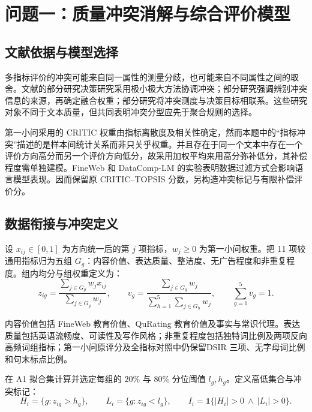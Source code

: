 
\section{问题一：质量冲突消解与综合评价模型}
\label{sec:q12}

\subsection{文献依据与模型选择}

多指标评价的冲突可能来自同一属性的测量分歧，也可能来自不同属性之间的取舍。文献的部分研究决策研究采用极小极大方法协调冲突\cite{yu2016}；部分研究强调辨别冲突信息的来源，再确定融合权重\cite{wang2023}；部分研究将冲突测度与决策目标相联系\cite{chen2026}。这些研究对象不同于文本质量，但共同表明冲突分型应先于聚合规则的选择。

第一小问采用的 CRITIC 权重由指标离散度及相关性确定\cite{diakoulaki1995}，然而本题中的“指标冲突”描述的是样本间统计关系而非只关乎权重。并且存在于同一个文本中存在一个评价方向高分而另一个评价方向低分，故采用加权平均来用高分弥补低分，其补偿程度需单独建模\cite{giarlotta2001}。FineWeb 和 DataComp-LM 的实验表明数据过滤方式会影响语言模型表现\cite{penedo2024,li2024}。因而保留原 CRITIC--TOPSIS 分数，另构造冲突标记与有限补偿评价分。

\subsection{数据衔接与冲突定义}

设 $x_{ij}\in[0,1]$ 为方向统一后的第 $j$ 项指标，$w_j\geq0$ 为第一小问权重。把 11 项较通用指标归为五组 $G_g$：内容价值、表达质量、整洁度、无广告程度和非重复程度。组内均分与组权重定义为：
\begin{equation}
z_{ig}=\frac{\sum_{j\in G_g}w_jx_{ij}}{\sum_{j\in G_g}w_j},\qquad
v_g=\frac{\sum_{j\in G_g}w_j}{\sum_{h=1}^{5}\sum_{j\in G_h}w_j},
\qquad \sum_{g=1}^{5}v_g=1.
\label{eq:q12-group}
\end{equation}

内容价值包括 FineWeb 教育价值、QuRating 教育价值及事实与常识代理。表达质量包括英语流畅度、可读性及写作风格；非重复程度包括独特词比例及两项反向高频词组指标；第一小问原评分及全指标对照中仍保留DSIR 三项、无字母词比例和句末标点比例。

在 A1 拟合集计算并选定每组的 $20\%$ 与 $80\%$ 分位阈值 $l_g,h_g$。定义高低集合与冲突标记：
\begin{equation}
H_i=\{g:z_{ig}>h_g\},\qquad
L_i=\{g:z_{ig}<l_g\},\qquad
I_i=\mathbf{1}\{|H_i|>0\ \land\ |L_i|>0\}.
\label{eq:q12-conflict}
\end{equation}

